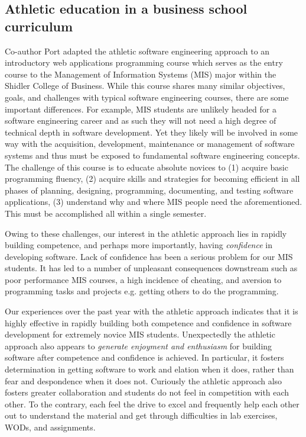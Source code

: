 \subsection{Athletic education in a business school curriculum}

Co-author Port adapted the athletic software engineering approach to an introductory web applications programming course which serves as the entry course to the Management of Information Systems (MIS) major within the Shidler College of Business. While this course shares many similar objectives, goals, and challenges with typical software engineering courses, there are some important differences. For example, MIS students are unlikely headed for a software engineering career and as such they will not need a high degree of technical depth in software development. Yet they likely will be involved in some way with the acquisition, development, maintenance or management of software systems and thus must be exposed to fundamental software engineering concepts. The challenge of this course is to educate absolute novices to (1) acquire basic programming fluency, (2) acquire skills and strategies for becoming efficient in all phases of planning, designing, programming, documenting, and testing software applications, (3) understand why and where MIS people need the aforementioned. This must be accomplished all within a single semester. 

Owing to these challenges, our interest in the athletic approach lies in rapidly building competence, and perhaps more importantly, having {\em confidence} in developing software. Lack of confidence has been a serious problem for our MIS students. It has led to a number of unpleasant consequences downstream such as poor performance MIS courses, a high incidence of cheating, and aversion to programming tasks and projects e.g. getting others to do the programming. 

Our experiences over the past year with the athletic approach indicates that it is highly effective in rapidly building both competence and confidence in software development for extremely novice MIS students. Unexpectedly the athletic approach also appears to {\em generate enjoyment and enthusiasm} for building software after competence and confidence is achieved. In particular, it fosters determination in getting software to work and elation when it does, rather than fear and despondence when it does not. Curiously the athletic approach also fosters greater collaboration and students do not feel in competition with each other. To the contrary, each feel the drive to excel and frequently help each other out to understand the material and get through difficulties in lab exercises, WODs, and assignments.
    
